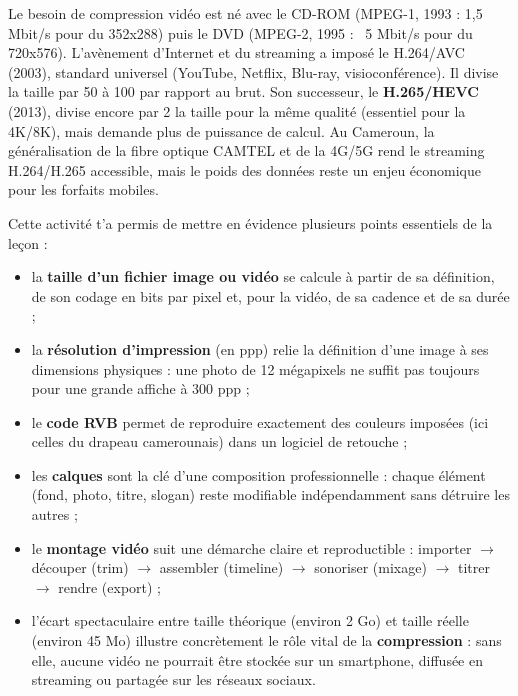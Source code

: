 \documentclass[11pt]{article}
\newcounter{popsec}
\newcounter{popsub}
\newcommand{\courssub}[1]{%
  \stepcounter{popsub}%
  \par\vspace{9pt}\noindent{\popxbold\fontsize{11.5}{13}\selectfont\color{popink}{\color{poporange}\thepopsec.\thepopsub}\hspace{6pt}#1}\par\nopagebreak\vspace{4pt}
}
\begin{document}
\begin{savaistu}
Le besoin de compression vidéo est né avec le CD-ROM (MPEG-1, 1993 : 1,5 Mbit/s pour du 352x288) puis le DVD (MPEG-2, 1995 : ~5 Mbit/s pour du 720x576). L'avènement d'Internet et du streaming a imposé le H.264/AVC (2003), standard universel (YouTube, Netflix, Blu-ray, visioconférence). Il divise la taille par 50 à 100 par rapport au brut. Son successeur, le \textbf{H.265/HEVC} (2013), divise encore par 2 la taille pour la même qualité (essentiel pour la 4K/8K), mais demande plus de puissance de calcul. Au Cameroun, la généralisation de la fibre optique CAMTEL et de la 4G/5G rend le streaming H.264/H.265 accessible, mais le poids des données reste un enjeu économique pour les forfaits mobiles.
\end{savaistu}

\courssub{Bilan de l'activité}

Cette activité t'a permis de mettre en évidence plusieurs points essentiels de la leçon :

\begin{itemize}
  \item la \textbf{taille d'un fichier image ou vidéo} se calcule à partir de sa définition, de son codage en bits par pixel et, pour la vidéo, de sa cadence et de sa durée ;
  \item la \textbf{résolution d'impression} (en ppp) relie la définition d'une image à ses dimensions physiques : une photo de 12 mégapixels ne suffit pas toujours pour une grande affiche à 300 ppp ;
  \item le \textbf{code RVB} permet de reproduire exactement des couleurs imposées (ici celles du drapeau camerounais) dans un logiciel de retouche ;
  \item les \textbf{calques} sont la clé d'une composition professionnelle : chaque élément (fond, photo, titre, slogan) reste modifiable indépendamment sans détruire les autres ;
  \item le \textbf{montage vidéo} suit une démarche claire et reproductible : importer $\rightarrow$ découper (trim) $\rightarrow$ assembler (timeline) $\rightarrow$ sonoriser (mixage) $\rightarrow$ titrer $\rightarrow$ rendre (export) ;
  \item l'écart spectaculaire entre taille théorique (environ 2 Go) et taille réelle (environ 45 Mo) illustre concrètement le rôle vital de la \textbf{compression} : sans elle, aucune vidéo ne pourrait être stockée sur un smartphone, diffusée en streaming ou partagée sur les réseaux sociaux.
\end{itemize}
\end{document}
